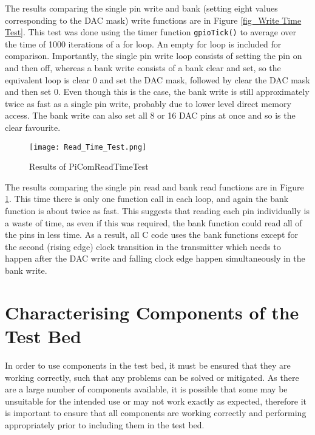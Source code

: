 \documentclass[../main.tex]{subfiles}
\begin{document}
The results comparing the single pin write and bank (setting eight values corresponding to the DAC mask) write functions are in Figure \ref{fig_Write Time Test}.
This test was done using the timer function \colorbox{backcolour}{\lstinline{gpioTick()}} to average over the time of 1000 iterations of a for loop.
An empty for loop is included for comparison.
Importantly, the single pin write loop consists of setting the pin on and then off, whereas a bank write consists of a bank clear and set, so the equivalent loop is clear 0 and set the DAC mask, followed by clear the DAC mask and then set 0.
Even though this is the case, the bank write is still approximately twice as fast as a single pin write, probably due to lower level direct memory access.
The bank write can also set all 8 or 16 DAC pins at once and so is the clear favourite.\\

\begin{figure}[ht]
	\centering
	\texttt{[image: Read\_Time\_Test.png]}
	\caption{Results of PiCom\textunderscore Read\textunderscore Time\textunderscore Test}
	\label{fig_Read Time Test}
\end{figure}

The results comparing the single pin read and bank read functions are in Figure \ref{fig_Read Time Test}.
This time there is only one function call in each loop, and again the bank function is about twice as fast.
This suggests that reading each pin individually is a waste of time, as even if this was required, the bank function could read all of the pins in less time.
As a result, all C code uses the bank functions except for the second (rising edge) clock transition in the transmitter which needs to happen after the DAC write and falling clock edge happen simultaneously in the bank write.


\section{Characterising Components of the Test Bed} \label{sec_Components}

In order to use components in the test bed, it must be ensured that they are working correctly, such that any problems can be solved or mitigated.
As there are a large number of components available, it is possible that some may be unsuitable for the intended use or may not work exactly as expected, therefore it is important to ensure that all components are working correctly and performing appropriately prior to including them in the test bed.
\end{document}
